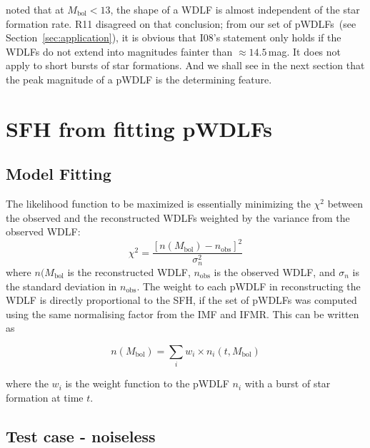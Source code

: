 \documentclass[fleqn,usenatbib]{mnras}
\begin{document}
\citet[][hereafter, I08]{2008ApJ...682L.109I} noted that at $M_{\mathrm{bol}} < 13$, the shape of
a WDLF is almost independent of the star formation rate. R11 disagreed on that
conclusion; from our set of pWDLFs~(see Section~\ref{sec:application}), it is obvious that I08's statement
only holds if the WDLFs do not extend into magnitudes fainter than
$\approx14.5$\,mag. It does not apply to short bursts of star formations.
And we shall see in the next section that the peak magnitude of a pWDLF is the
determining feature.

\section{SFH from fitting pWDLFs}

\subsection{Model Fitting}
\label{sec:model_fitting}
The likelihood function to be maximized is essentially minimizing the $\chi^2$
between the observed and the reconstructed WDLFs weighted by the variance from
the observed WDLF:
\begin{equation}
    \chi^2 = \frac{\left[n(M_\mathrm{bol}) - n_\mathrm{obs}\right]^2}{\sigma_n^2}
\end{equation}
where $n(M_\mathrm{bol}$ is the reconstructed WDLF, $n_\mathrm{obs}$ is the
observed WDLF, and $\sigma_n$ is the standard deviation in $n_\mathrm{obs}$.
The weight to each pWDLF in reconstructing the WDLF is directly proportional to
the SFH, if the set of pWDLFs was computed using the same normalising factor
from the IMF and IFMR. This can be written as

\begin{equation}
    n(M_\mathrm{bol}) = \sum_i w_i \times n_i(t, M_\mathrm{bol})    
\end{equation}

where the $w_i$ is the weight function to the pWDLF $n_i$ with a burst of star
formation at time $t$.

\subsection{Test case - noiseless}
\end{document}
